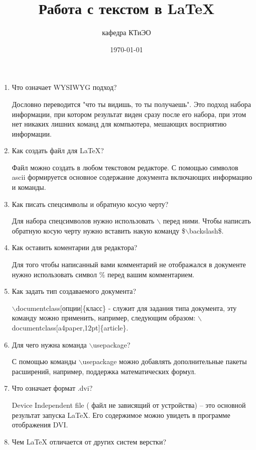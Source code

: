 \documentclass[a4paper,12pt]{article} %
\author{кафедра КТиЭО}
\title{Работа с текстом в \LaTeX{}}
\date{\today}
\begin{document}
\begin{enumerate}
    \item Что означает WYSIWYG подход? 
    
    Дословно переводится "что ты видишь, то ты получаешь". Это подход набора информации, при котором результат виден сразу после его набора, при этом нет никаких лишних команд для компьютера, мешающих восприятию информации.
    
    \item Как создать файл для LaTeX? 
    
    Файл можно создать в любом текстовом редакторе. С помощью символов ascii формируется основное содержание документа включающих информацию и команды.
    
    \item Как писать спецсимволы и обратную косую черту?
     
    Для набора спецсимволов нужно использовать $\backslash$ перед ними. Чтобы написать обратную косую черту нужно вставить накую команду \$$\backslash$backslash\$.
    
    \item Как оставить коментарии для редактора?
    
    Для того чтобы написанный вами комментарий не отображался в документе нужно использовать символ \% перед вашим комментарием.
    
    \item Как задать тип создаваемого документа?
    
    $\backslash$documentclass[опции]\{класс\} - служит для задания типа документа, эту команду можно применить, например, следующим образом: $\backslash$documentclass[a4paper,12pt]\{article\}.
    
    \item Для чего нужна команда  $\backslash$usepackage?
    
     С помощью команды $\backslash$usepackage можно добавлять дополнительные пакеты расширений, например, поддержка математических формул.
    
    \item Что означает формат .dvi?
    
    Device Independent file ( файл не зависящий от устройства) -- это основной результат запуска LaTeX. Его содержимое можно увидеть в программе отображения DVI.
    
    \item Чем LaTeX отличается от других систем верстки?
    

\end{enumerate}
\end{document}
